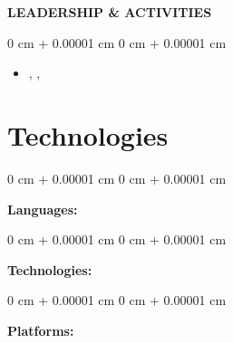 \documentclass[10pt, letterpaper]{article}
\newenvironment{highlights}{
    \begin{itemize}[
        topsep=0.10 cm,
        parsep=0.10 cm,
        partopsep=0pt,
        itemsep=0pt,
        leftmargin=0 cm + 10pt
    ]
}{
    \end{itemize}
} %
\newenvironment{onecolentry}{
    \begin{adjustwidth}{
        0 cm + 0.00001 cm
    }{
        0 cm + 0.00001 cm
    }
}{
    \end{adjustwidth}
} %
\begin{document}
\vspace{0.2cm}
\textbf{LEADERSHIP \& ACTIVITIES}
\begin{onecolentry}
\begin{highlights}
\item {}, , 
\end{highlights}
\end{onecolentry}

\vspace{0.2cm}
\section{Technologies}
\begin{onecolentry}
\textbf{Languages:} 
\end{onecolentry}
\vspace{0.2 cm}
\begin{onecolentry}
\textbf{Technologies:} 
\end{onecolentry}
\vspace{0.2 cm}
\begin{onecolentry}
\textbf{Platforms:} 
\end{onecolentry}
\end{document}
